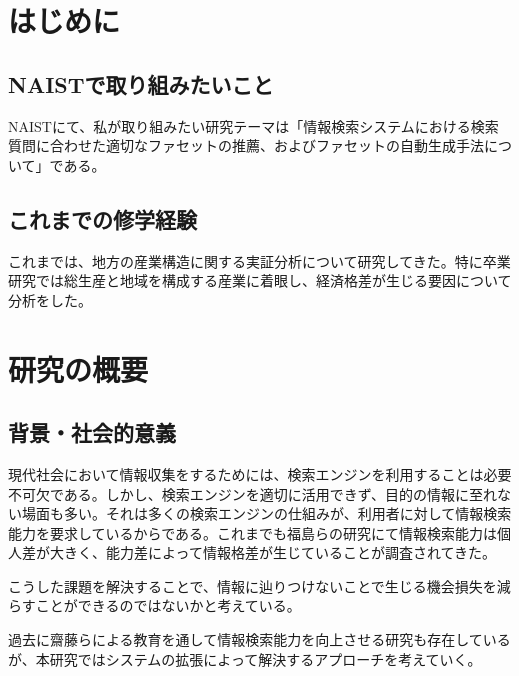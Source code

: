 \documentclass[a4j,12pt, twocolumn]{jarticle}
\begin{document}
\section{はじめに}
\subsection{NAISTで取り組みたいこと}
 NAISTにて、私が取り組みたい研究テーマは「情報検索システムにおける検索質問に合わせた適切なファセットの推薦、およびファセットの自動生成手法について」である。
\subsection{これまでの修学経験}
 これまでは、地方の産業構造に関する実証分析について研究してきた。特に卒業研究では総生産と地域を構成する産業に着眼し、経済格差が生じる要因について分析をした。

\section{研究の概要}
\subsection{背景・社会的意義}
 現代社会において情報収集をするためには、検索エンジンを利用することは必要不可欠である。しかし、検索エンジンを適切に活用できず、目的の情報に至れない場面も多い。それは多くの検索エンジンの仕組みが、利用者に対して情報検索能力を要求しているからである。これまでも福島らの研究にて情報検索能力は個人差が大きく、能力差によって情報格差が生じていることが調査されてきた\cite{fukushima}。

 こうした課題を解決することで、情報に辿りつけないことで生じる機会損失を減らすことができるのではないかと考えている。
 
 過去に齋藤らによる教育を通して情報検索能力を向上させる研究\cite{saito}も存在しているが、本研究ではシステムの拡張によって解決するアプローチを考えていく。
\end{document}
